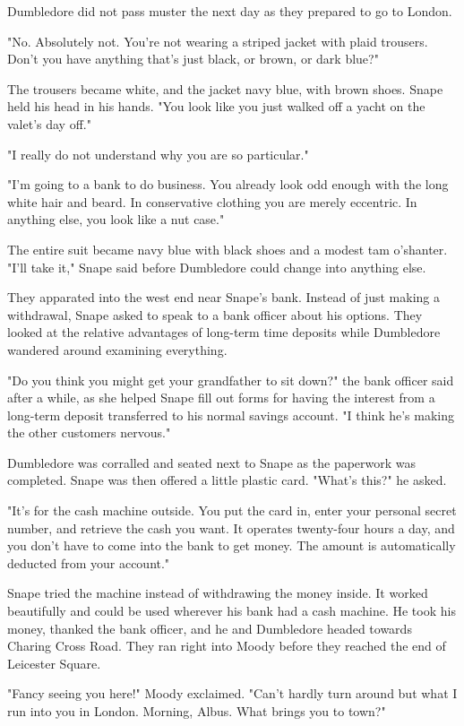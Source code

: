 Dumbledore did not pass muster the next day as they prepared to go to London.

"No. Absolutely not. You're not wearing a striped jacket with plaid trousers. Don't you have anything that's just black, or brown, or dark blue?"

The trousers became white, and the jacket navy blue, with brown shoes. Snape held his head in his hands. "You look like you just walked off a yacht on the valet's day off."

"I really do not understand why you are so particular."

"I'm going to a bank to do business. You already look odd enough with the long white hair and beard. In conservative clothing you are merely eccentric. In anything else, you look like a nut case."

The entire suit became navy blue with black shoes and a modest tam o'shanter. "I'll take it," Snape said before Dumbledore could change into anything else.

They apparated into the west end near Snape's bank. Instead of just making a withdrawal, Snape asked to speak to a bank officer about his options. They looked at the relative advantages of long-term time deposits while Dumbledore wandered around examining everything.

"Do you think you might get your grandfather to sit down?" the bank officer said after a while, as she helped Snape fill out forms for having the interest from a long-term deposit transferred to his normal savings account. "I think he's making the other customers nervous."

Dumbledore was corralled and seated next to Snape as the paperwork was completed. Snape was then offered a little plastic card. "What's this?" he asked.

"It's for the cash machine outside. You put the card in, enter your personal secret number, and retrieve the cash you want. It operates twenty-four hours a day, and you don't have to come into the bank to get money. The amount is automatically deducted from your account."

Snape tried the machine instead of withdrawing the money inside. It worked beautifully and could be used wherever his bank had a cash machine. He took his money, thanked the bank officer, and he and Dumbledore headed towards Charing Cross Road. They ran right into Moody before they reached the end of Leicester Square.

"Fancy seeing you here!" Moody exclaimed. "Can't hardly turn around but what I run into you in London. Morning, Albus. What brings you to town?"

